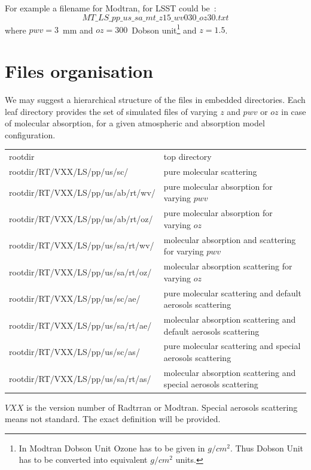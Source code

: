 \documentclass[a4paper]{article}
\begin{document}
For example a filename for Modtran, for LSST could be~:
\begin{equation}
MT\_LS\_pp\_us\_sa\_mt\_z15\_wv030\_oz30.txt  \nonumber
\end{equation}
where $pwv=3$~mm and $oz=300$~Dobson unit\footnote{In Modtran Dobson Unit Ozone has to be given in $g/cm^2$. Thus Dobson Unit has to be converted into equivalent $g/cm^2$ units.} and $z=1.5$.


\section{Files organisation}
We may suggest a hierarchical structure  of the files in embedded directories.
Each leaf directory provides the set of simulated files of varying $z$ and $pwv$ or $oz$ in case of molecular absorption, for a given atmospheric and absorption model configuration.

\begin{table}[h]
{\small
\begin{tabular}{ l l}
  rootdir &  top directory \\
 rootdir/RT/VXX/LS/pp/us/sc/ & pure molecular scattering \\
 rootdir/RT/VXX/LS/pp/us/ab/rt/wv/ & pure molecular absorption for varying $pwv$ \\
 rootdir/RT/VXX/LS/pp/us/ab/rt/oz/ & pure molecular absorption for varying $oz$ \\
 rootdir/RT/VXX/LS/pp/us/sa/rt/wv/ & molecular absorption and scattering for varying $pwv$ \\
 rootdir/RT/VXX/LS/pp/us/sa/rt/oz/ & molecular absorption scattering for varying $oz$ \\
 rootdir/RT/VXX/LS/pp/us/sc/ae/ & pure molecular scattering and default aerosols scattering \\
 rootdir/RT/VXX/LS/pp/us/sa/rt/ae/ & molecular absorption scattering and default aerosols scattering \\
 rootdir/RT/VXX/LS/pp/us/sc/as/ & pure molecular scattering and special aerosols scattering \\
 rootdir/RT/VXX/LS/pp/us/sa/rt/as/ & molecular absorption scattering and special aerosols scattering \\
\end{tabular}
}
\end{table}
$VXX$ is the version number of Radtrran or Modtran.
Special aerosols scattering means not standard. The exact definition will be provided.
\end{document}
